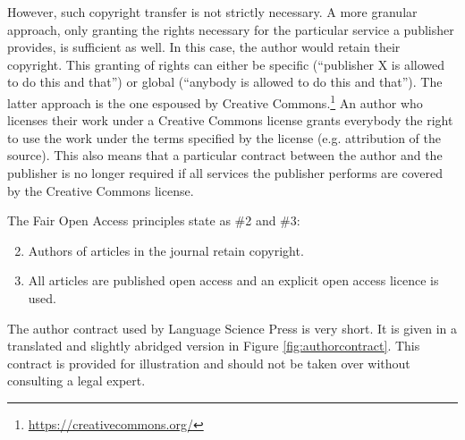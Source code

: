 \documentclass[nonflat,modfonts,output=book] {langsci/langscibook}
\newcommand{\footurl}[1]{\footnote{\url{#1}}}
\begin{document}
However, such copyright transfer is not strictly necessary. A more granular approach, only granting the rights necessary for the particular service a publisher provides, is sufficient as well. In this case, the author would retain their copyright. This granting of rights can either be specific (``publisher X is allowed to do this and that'') or global (``anybody is allowed to do this and that''). The latter approach is the one espoused by Creative Commons.\footurl{https://creativecommons.org/} An author who licenses their work under a Creative Commons license grants everybody the right to use the work under the terms specified by the license (e.g. attribution of the source). This also means that a particular contract between the author and the publisher is no longer required if all services the publisher performs are covered by the Creative Commons license. 

The Fair Open Access principles state as \#2 and \#3:

\begin{enumerate}
\setcounter{enumi}{1}
\item Authors of articles in the journal retain copyright.
\item All articles are published open access and an explicit open access licence is used.
\end{enumerate}

\noindent The author contract used by Language Science Press is very short. It is given in a translated and slightly abridged version in Figure \ref{fig:authorcontract}. This contract is provided for illustration and should not be taken over without consulting a legal expert.
\end{document}
